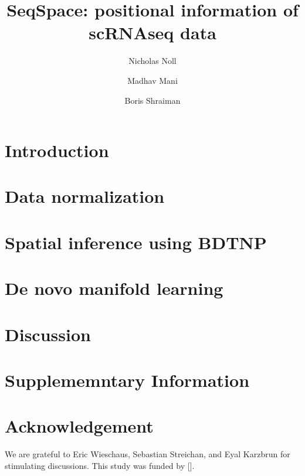 \documentclass[aps,rmp,reprint,superscriptaddress,notitlepage,10pt]{revtex4-1}
\begin{document}
\title{SeqSpace: positional information of scRNAseq data}
\author{Nicholas Noll}
\author{Madhav Mani}
\author{Boris Shraiman}

\begin{abstract}
\end{abstract}

\maketitle

\section{Introduction}
\section{Data normalization}
\section{Spatial inference using BDTNP}
\section{De novo manifold learning}
\section{Discussion}
\section{Supplememntary Information}

\section*{Acknowledgement}
We are grateful to Eric Wieschaus, Sebastian Streichan, and Eyal Karzbrun for stimulating discussions.
This study was funded by [].

{}
\end{document}
